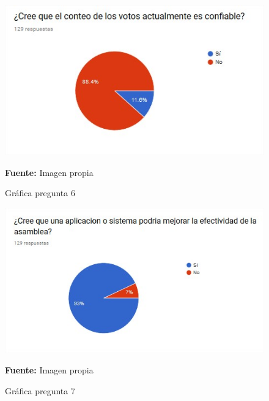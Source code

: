 
\begin{figure}[th!]
	\centering
	\includegraphics[width=0.7\linewidth]{desarrollo/resultados/imgs/pregunta-6}
	\caption{Gráfica pregunta 6}{\scriptsize \textbf{Fuente:} Imagen propia}
\end{figure}


\begin{figure}[th!]
	\centering
	\includegraphics[width=0.7\linewidth]{desarrollo/resultados/imgs/pregunta-7}
	\caption{Gráfica pregunta 7}{\scriptsize \textbf{Fuente:} Imagen propia}
\end{figure}


